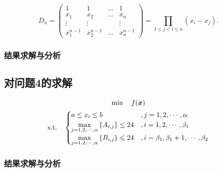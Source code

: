 \zhlipsum[3]

\begin{equation}\label{equ:VandermondeDet}
D_n = \begin{pmatrix}
1 & 1 & \ldots & 1 \\
x_1 & x_2 & \ldots & x_n \\
\vdots & \vdots & & \vdots \\
x_1^{n-1} & x_2^{n-1} & \ldots & x_n^{n-1}
\end{pmatrix} = \prod_{1\leq j<i\leq n}{(x_i-x_j)}.
\end{equation}

\zhlipsum[4]

\subsubsection{结果求解与分析}


\subsection{对问题4的求解}

\begin{gather}\label{equ:规划模型}
\min\quad{f(\boldsymbol{x})} \\
\text{s.t.}\quad\begin{cases}
    a \leq x_i\leq b &, j=1,2,\cdots ,\alpha \\
	\max\limits_{j=1,2,\cdots ,\alpha}{\{A_{i,j}\}} \leq 24 &, i=1,2,\cdots ,\beta_1\\
	\max\limits_{j=1,2,\cdots ,\alpha}{\{B_{i,j}\}} \leqslant 24 &, i=\beta_1, \beta_1+1,\cdots, \beta_2 \\
    \end{cases}
\end{gather}

\subsubsection{结果求解与分析}



